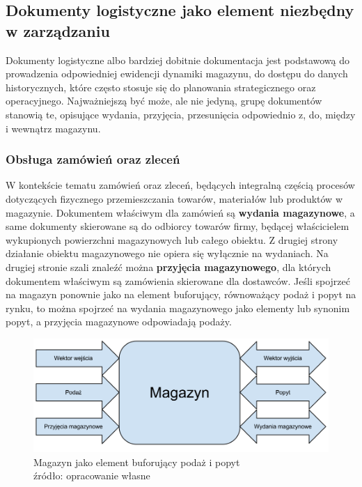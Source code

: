 	\subsection{Dokumenty logistyczne jako element niezbędny w zarządzaniu}
		Dokumenty logistyczne albo bardziej dobitnie dokumentacja jest podstawową do prowa\-dzenia odpowiedniej
		ewidencji dynamiki magazynu, do dostępu do danych historycznych, które często stosuje się
		do planowania strategicznego oraz operacyjnego. Najważniejszą być może, ale nie jedyną, grupę dokumentów
		stanowią te, opisujące wydania, przyjęcia, przesunięcia odpowiednio z, do, między i wewnątrz magazynu.
	\subsubsection{Obsługa zamówień oraz zleceń}
		W kontekście tematu zamówień oraz zleceń, będących integralną częścią procesów dotyczących fizycznego
		przemieszczania towarów, materiałów lub produktów w magazynie. Dokumentem właściwym dla zamówień są
		\textbf{wydania magazynowe}, a same dokumenty skierowane są do odbiorcy towarów firmy, będącej właścicielem
		wykupionych powierzchni magazynowych lub całego obiektu. Z drugiej strony działanie obiektu magazynowego
		nie opiera się wyłącznie na wydaniach. Na drugiej stronie szali znaleźć można \textbf{przyjęcia magazynowego},
		dla których dokumentem właściwym są zamówienia skierowane dla dostawców. Jeśli spojrzeć na magazyn ponownie jako
		na element buforujący, równoważący podaż i popyt na rynku, to można spojrzeć na wydania magazynowego jako
		elementy lub synonim popyt, a przyjęcia magazynowe odpowiadają podaży. 
		
		\begin{figure}[H]
			\centering
			\includegraphics[width=\textwidth]{images/warehouse_buffer}
			\caption[Magazyn jako bufor]{
				Magazyn jako element buforujący podaż i popyt\\
				źródło: opracowanie własne
			}
		\end{figure}
		
